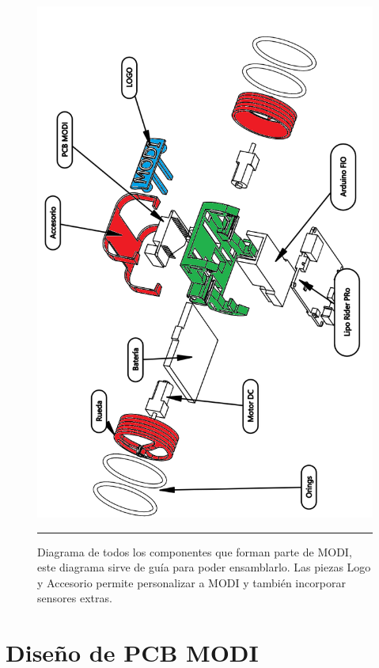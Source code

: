 \begin{figure}[htbp]
	\centering
		\includegraphics[width=\textwidth]{./Figures/MODI/ensamble.png}
		\rule{35em}{0.5pt}
	\caption[Diagrama MODI versión final]{Diagrama de todos los componentes que forman parte de MODI, este diagrama sirve de guía para poder ensamblarlo. Las piezas Logo y Accesorio permite personalizar a MODI y también incorporar sensores extras.}
	\label{fig:DiagramaVersionFinal}
\end{figure}	

\FloatBarrier
\section{Diseño de PCB MODI}

